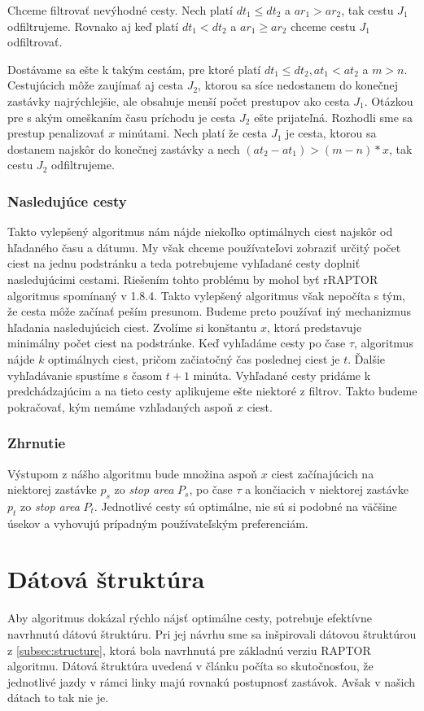 Chceme filtrovať nevýhodné cesty. Nech platí $dt_1 \leq dt_2$ a $ar_1 > ar_2$, tak cestu $J_1$ odfiltrujeme. Rovnako aj keď platí $dt_1 < dt_2$ a $ar_1 \geq ar_2$ chceme cestu $J_1$ odfiltrovať. 

Dostávame sa ešte k takým cestám, pre ktoré platí $dt_1 \leq dt_2, at_1<at_2$ a $m>n$. Cestujúcich môže zaujímať aj cesta $J_2$, ktorou sa síce nedostanem do konečnej zastávky najrýchlejšie, ale obsahuje menší počet prestupov ako cesta $J_1$. Otázkou pre s akým omeškaním času príchodu je cesta $J_2$ ešte prijateľná. Rozhodli sme sa prestup penalizovať $x$ minútami. Nech platí že cesta $J_1$ je cesta, ktorou sa dostanem najskôr do konečnej zastávky a nech $(at_2-at_1) > (m-n) * x$, tak cestu $J_2$ odfiltrujeme.

\subsubsection{Nasledujúce cesty}
Takto vylepšený algoritmus nám nájde niekoľko optimálnych ciest najskôr od hľadaného času a dátumu. My však chceme používateľovi zobraziť určitý počet ciest na jednu podstránku a teda potrebujeme vyhľadané cesty doplniť nasledujúcimi cestami. 
Riešením tohto problému by mohol byť rRAPTOR algoritmus spomínaný v 1.8.4. Takto vylepšený algoritmus však nepočíta s tým, že cesta môže začínať peším presunom. Budeme preto používať iný mechanizmus hľadania nasledujúcich ciest.
Zvolíme si konštantu $x$, ktorá predstavuje minimálny počet ciest na podstránke. Keď vyhľadáme cesty po čase $\tau$, algoritmus nájde $k$ optimálnych ciest, pričom začiatočný čas poslednej ciest je $t$. Ďalšie vyhľadávanie spustíme s časom $t + 1$ minúta. Vyhľadané cesty pridáme k predchádzajúcim a na tieto cesty aplikujeme ešte niektoré z filtrov. Takto budeme pokračovať, kým nemáme vzhľadaných aspoň $x$ ciest.

\subsubsection{Zhrnutie}
Výstupom z nášho algoritmu bude množina aspoň $x$ ciest začínajúcich na niektorej zastávke $p_s$ zo \textit{stop area} $P_s$, po čase $\tau$ a končiacich v niektorej zastávke $p_t$ zo \textit{stop area} $P_t$. Jednotlivé cesty sú optimálne, nie sú si podobné na väčšine úsekov a vyhovujú prípadným používateľským preferenciám.

\section{Dátová štruktúra}
Aby algoritmus dokázal rýchlo nájsť optimálne cesty, potrebuje efektívne navrhnutú dátovú štruktúru. Pri jej návrhu sme sa inšpirovali dátovou štruktúrou z \ref{subsec:structure}, ktorá bola navrhnutá pre základnú verziu RAPTOR algoritmu. Dátová štruktúra uvedená v článku počíta so skutočnosťou, že jednotlivé jazdy v rámci linky majú rovnakú postupnosť zastávok. Avšak v našich dátach to tak nie je. 

